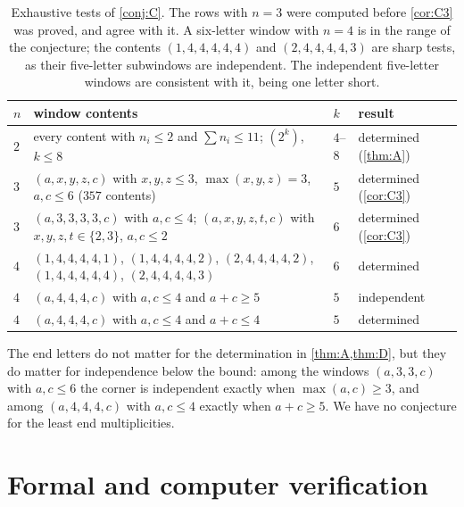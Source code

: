 \documentclass[11pt,a4paper]{article}
\begin{document}
\begin{table}[htb]
\centering
\small
\begin{tabular}{@{}l>{\raggedright\arraybackslash}p{8.2cm}ll@{}}
\toprule
$n$ & window contents & $k$ & result\\
\midrule
$2$ & every content with $n_i\le2$ and $\sum n_i\le11$; $(2^k)$, $k\le8$ & $4$--$8$ & determined (\cref{thm:A})\\
$3$ & $(a,x,y,z,c)$ with $x,y,z\le3$, $\max(x,y,z)=3$, $a,c\le6$ ($357$ contents) & $5$ & determined (\cref{cor:C3})\\
$3$ & $(a,3,3,3,3,c)$ with $a,c\le4$; $(a,x,y,z,t,c)$ with $x,y,z,t\in\{2,3\}$, $a,c\le2$ & $6$ & determined (\cref{cor:C3})\\
$4$ & $(1,4,4,4,4,1)$, $(1,4,4,4,4,2)$, $(2,4,4,4,4,2)$, $(1,4,4,4,4,4)$, $(2,4,4,4,4,3)$ & $6$ & determined\\
$4$ & $(a,4,4,4,c)$ with $a,c\le4$ and $a+c\ge5$ & $5$ & independent\\
$4$ & $(a,4,4,4,c)$ with $a,c\le4$ and $a+c\le4$ & $5$ & determined\\
\bottomrule
\end{tabular}
\caption{Exhaustive tests of \cref{conj:C}. The rows with $n=3$ were computed before \cref{cor:C3} was proved, and agree with it. A six-letter window with $n=4$ is in the range of the conjecture; the contents $(1,4,4,4,4,4)$ and $(2,4,4,4,4,3)$ are sharp tests, as their five-letter subwindows are independent. The independent five-letter windows are consistent with it, being one letter short.}\label{tab:evidence}
\end{table}

The end letters do not matter for the determination in \cref{thm:A,thm:D}, but they do matter for independence below the bound: among the windows $(a,3,3,c)$ with $a,c\le6$ the corner is independent exactly when $\max(a,c)\ge3$, and among $(a,4,4,4,c)$ with $a,c\le4$ exactly when $a+c\ge5$. We have no conjecture for the least end multiplicities.

\section{Formal and computer verification}\label{sec:verify}
\end{document}
